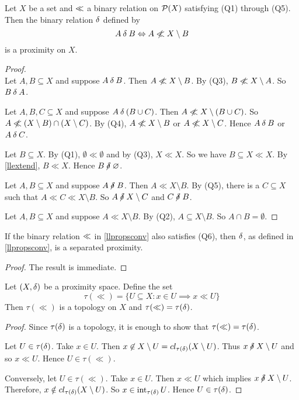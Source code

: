 \begin{proposition}
	\label{llpropsconv}
	Let \( X \) be a set and \( \mathord{\ll} \) a binary relation on \( \mathcal{P}(X) \) satisfying (Q1) through (Q5).  Then the binary relation \( \mathord{\delta} \) defined by
	\[ A \near B \iff A \nll X \setminus B \]
	is a proximity on \( X \).
\end{proposition}
\begin{proof}~\\
		Let \( A,B \subseteq X \) and suppose \( A \mathbin{\delta} B \).  Then \( A \nll X \setminus B \).  By (Q3), \( B \nll X \setminus A \).  So \( B \mathbin{\delta} A \).
		
		Let \( A,B,C \subseteq X \) and suppose \( A \mathbin{\delta} (B \cup C) \).  Then \( A \nll X \setminus (B \cup C) \).  So \( A \nll (X \setminus B) \cap (X \setminus C) \).  By (Q4), \( A \nll X \setminus B \) or \( A \nll X \setminus C \).  Hence \( A \mathbin{\delta} B \) or \( A \mathbin{\delta} C \).
		
		Let \( B \subseteq X \).  By (Q1), \( \emptyset \ll \emptyset \) and by (Q3), \( X \ll X \).  So we have \( B \subseteq X \ll X \).  By \ref{llextend}, \( B \ll X \).  Hence \( B \nnear \emptyset \).
		
		Let \( A,B \subseteq X \) and suppose \( A \nnear B \).  Then \( A \ll X \setminus B \).  By (Q5), there is a \( C \subseteq X \) such that \( A \ll C \ll X \setminus B \).  So \( A \nnear X \setminus C \) and \( C \nnear B \).
		
		Let \( A,B \subseteq X \) and suppose \( A \ll X \setminus B \).  By (Q2), \( A \subseteq X \setminus B \).  So \( A \cap B = \emptyset \).
\end{proof}

\begin{proposition}
	If the binary relation \( \mathord{\ll} \) in \ref{llpropsconv} also satisfies (Q6), then \( \mathord{\delta} \), as defined in \ref{llpropsconv}, is a separated proximity.
\end{proposition}
\begin{proof}
	The result is immediate.
\end{proof}

\begin{theorem}
	\label{lltop}
	Let \( (X,\mathord{\delta}) \) be a proximity space.  Define the set
	\[ \tau(\ll) = \{ U \subseteq X: x \in U \implies x \ll U \} \]
	Then \( \tau(\ll) \) is a topology on \( X \) and \( \tau(\ll) = \tau(\mathord{\delta}) \).
\end{theorem}
\begin{proof}
	Since \( \tau(\mathord{\delta}) \) is a topology, it is enough to show that \( \tau(\ll) = \tau(\mathord{\delta}) \).
	
	Let \( U \in \tau(\mathord{\delta}) \).  Take \( x \in U \).  Then \( x \not\in X \setminus U = cl_{\tau(\mathord{\delta})}(X \setminus U) \).  Thus \( x \nnear X \setminus U \) and so \( x \ll U \).  Hence \( U \in \tau(\ll) \).
	
	Conversely, let \( U \in \tau(\ll) \).  Take \( x \in U \).  Then \( x \ll U \) which implies \( x \nnear X \setminus U \).  Therefore, \( x \notin cl_{\tau(\mathord{\delta})}(X \setminus U) \).  So \( x \in \operatorname{int}_{\tau(\mathord{\delta})}U \).  Hence \( U \in \tau(\mathord{\delta}) \).
\end{proof}

